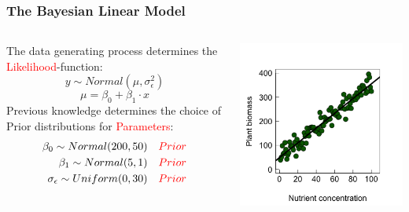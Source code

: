 \documentclass{beamer}
\begin{document}
\begin{frame}
    \frametitle{The Bayesian Linear Model}
    \begin{columns}
        \begin{column}{0.6\textwidth}
            The data generating process determines the \textcolor{red}{Likelihood}-function:\\
            \[
            y \sim Normal(\mu, \sigma_\epsilon^2)
            \]
            \[
            \mu = \beta_0 + \beta_1 \cdot x
            \] 
            Previous knowledge determines the choice of Prior distributions for \textcolor{red}{Parameters}:
            \begin{align*}
                \beta_0 \sim Normal(200,50) \quad \textcolor{red}{Prior} \\
                \beta_1 \sim Normal(5,1) \quad \textcolor{red}{Prior} \\
                \sigma_\epsilon \sim Uniform(0,30) \quad \textcolor{red}{Prior}
            \end{align*}
        \end{column}
        \begin{column}{0.4\textwidth}
            \includegraphics[width=\textwidth]{lectures/day_11_bayesian_lm/figures/unnamed-chunk-5-1.png}
        \end{column}
    \end{columns}
\end{frame}
\end{document}
